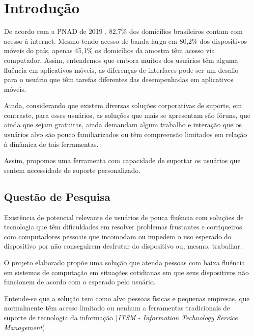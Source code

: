 
\chapter[Introdução]{Introdução}

De acordo com a PNAD de 2019 \citeauthor{PNAD:2019}, 82,7\% dos domicílios brasileiros contam com acesso à internet. Mesmo tendo acesso de banda larga em 80,2\% dos dispositivos móveis do país, apenas 45,1\% os domicílios da amostra têm acesso via computador. Assim, entendemos que embora muitos dos usuários têm alguma fluência em aplicativos móveis, as diferenças de interfaces pode ser um desafio para o usuário que têm tarefas diferentes das desempenhadas em aplicativos móveis.

Ainda, considerando que existem diversas soluções corporativas de suporte, em contraste, para esses usuários, as soluções que mais se apresentam são fóruns, que ainda que sejam gratuitas, ainda demandam algum trabalho e interação que os usuários alvo são pouco familiarizados ou têm compreensão limitados em relação à dinâmica de tais ferramentas.

Assim, propomos uma ferramenta com capacidade de suportar os usuários que sentem necessidade de suporte personalizado.

\section{Questão de Pesquisa}

Existência de potencial relevante de usuários de pouca fluência com soluções de tecnologia que têm dificuldades em resolver problemas frustantes e corriqueiros com computadores pessoais que  incomodam ou impedem o uso esperado do dispositivo por não conseguirem desfrutar do dispositivo ou, mesmo, trabalhar.



O projeto elaborado propõe uma solução que atenda pessoas com baixa fluência em sistemas de computação em situações cotidianas em que seus dispositivos não funcionem de acordo com o esperado pelo usuário.

Entende-se que a solução tem como alvo pessoas físicas e pequenas empresas, que normalmente têm acesso limitado ou nenhum a ferramentas tradicionais de suporte de tecnologia da informação (\textit{ITSM - Information Technology Service Management}).

